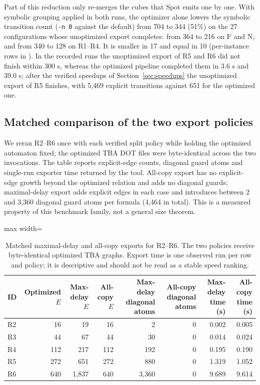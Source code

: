Part of this reduction only re-merges the cubes that Spot emits one by one.
With symbolic grouping applied in both runs, the optimizer alone lowers the
symbolic transition count (\texttt{-n 0} against the default) from 704 to 344
(51\%) on the 27 configurations whose unoptimized export completes: from 364
to 216 on F and N, and from 340 to 128 on R1--R4. It is smaller in 17 and
equal in 10 (per-instance rows in ). In the recorded runs the unoptimized export of R5 and R6 did not finish
within 300 s, whereas the optimized pipeline completed them in 3.6 s and 39.0 s;
after the verified speedups of Section~\ref{sec:speedups} the unoptimized export
of R5 finishes, with 5,469 explicit transitions against 651 for the optimized one.


\subsection{Matched comparison of the two export policies}
We reran R2--R6 once with each verified split policy while holding the optimized automaton fixed; the optimized TBA DOT files were byte-identical across the two invocations. The table reports explicit-edge counts, diagonal guard atoms and single-run exporter time returned by the tool. All-copy export has no explicit-edge growth beyond the optimized relation and adds no diagonal guards; maximal-delay export adds explicit edges in each case and introduces between 2 and 3,360 diagonal guard atoms per formula (4,464 in total). This is a measured property of this benchmark family, not a general size theorem.
\begin{table}[tp]
\centering
\caption{Matched maximal-delay and all-copy exports for R2--R6. The two
policies receive byte-identical optimized TBA graphs. Export time is one
observed run per row and policy; it is descriptive and should not be read as
a stable speed ranking.}
\label{tab:generated-export-policy}
\scriptsize
\setlength{\tabcolsep}{4pt}
\begin{adjustbox}{max width=\textwidth}\begin{tabular}{@{}lrrrrrrr@{}}
\toprule
ID & Optimized $E$ & Max-delay $E$ & All-copy $E$ & Max-delay diagonal atoms & All-copy diagonal atoms & Max-delay time (s) & All-copy time (s)\\
\midrule
R2 & 16 & 19 & 16 & 2 & 0 & 0.002 & 0.005\\
R3 & 44 & 67 & 44 & 30 & 0 & 0.014 & 0.024\\
R4 & 112 & 217 & 112 & 192 & 0 & 0.195 & 0.190\\
R5 & 272 & 651 & 272 & 880 & 0 & 1.319 & 1.052\\
R6 & 640 & 1,837 & 640 & 3,360 & 0 & 9.689 & 9.614\\
\bottomrule
\end{tabular}\end{adjustbox}
\end{table}

